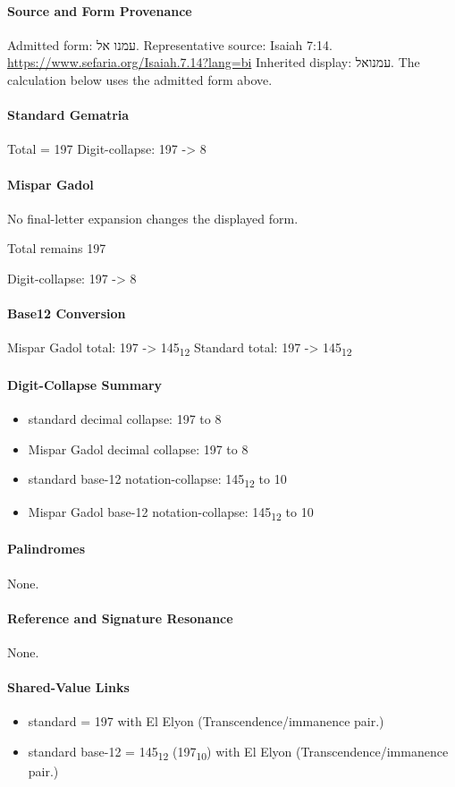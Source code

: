 \paragraph{Source and Form Provenance}
Admitted form: עמנו אל.
Representative source: Isaiah 7:14.
\url{https://www.sefaria.org/Isaiah.7.14?lang=bi}
Inherited display: עמנואל. The calculation below uses the admitted form above.
\paragraph{Standard Gematria}
Total = 197
Digit-collapse: 197 -> 8
\paragraph{Mispar Gadol}
No final-letter expansion changes the displayed form.

Total remains 197

Digit-collapse: 197 -> 8
\paragraph{Base12 Conversion}
Mispar Gadol total: 197 -> 145\textsubscript{12}
Standard total: 197 -> 145\textsubscript{12}
\paragraph{Digit-Collapse Summary}
\begin{itemize}
\item standard decimal collapse: 197 to 8
\item Mispar Gadol decimal collapse: 197 to 8
\item standard base-12 notation-collapse: 145\textsubscript{12} to 10
\item Mispar Gadol base-12 notation-collapse: 145\textsubscript{12} to 10
\end{itemize}
\paragraph{Palindromes}
None.
\paragraph{Reference and Signature Resonance}
None.
\paragraph{Shared-Value Links}
\begin{itemize}
\item standard = 197 with El Elyon (Transcendence/immanence pair.)
\item standard base-12 = 145\textsubscript{12} (197\textsubscript{10}) with El Elyon (Transcendence/immanence pair.)
\end{itemize}
